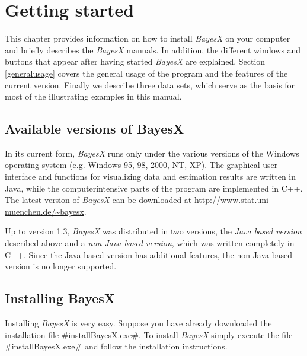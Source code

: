 \chapter{Getting started}
\label{gettingstarted}

This chapter provides information on how to install {\em BayesX} on
your computer and briefly describes the {\em BayesX} manuals. In
addition, the  different windows and buttons that appear after
having started {\em BayesX} are explained. Section
\ref{generalusage} covers the general usage of the program and the
features of the current version. Finally we describe three data
sets, which serve as the basis for most of the illustrating examples
in this manual.

\section{Available versions of BayesX}
\label{availableversions}    

In its current form, {\em BayesX} runs only under the various
versions of the Windows operating system (e.g. Windows 95, 98, 2000,
NT, XP). The graphical user interface and functions for visualizing
data and estimation results are written in Java, while the
computerintensive parts of the program are implemented in C++. The
latest version of {\em BayesX} can be downloaded at
\href{http://www.stat.uni-muenchen.de/~bayesx}
{http://www.stat.uni-muenchen.de/\~{}bayesx}.

Up to version 1.3, {\em BayesX} was distributed in two versions, the
{\em Java based version} described above and a {\em non-Java based
version}, which was written completely in C++. Since the Java based
version has additional features, the non-Java based version is no
longer supported.

\section{Installing BayesX}
  Installing
{\em BayesX} is very easy. Suppose you have already downloaded the
installation file #installBayesX.exe#. To install {\em BayesX}
simply execute the file #installBayesX.exe# and follow the
installation instructions.

